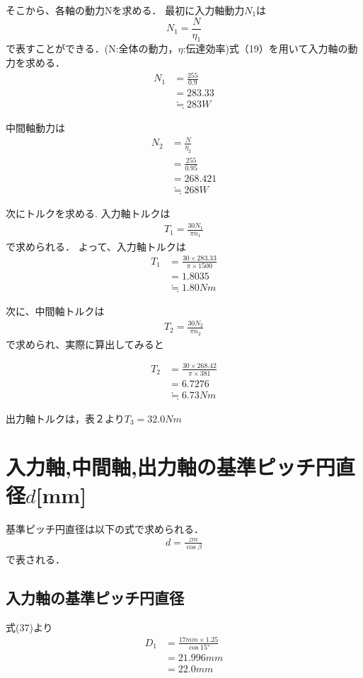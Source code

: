 \documentclass[a4paper,titlepage]{ltjsarticle}
\begin{document}
そこから、各軸の動力Nを求める．
最初に入力軸動力$N_1$は
\begin{equation}
	N_1=\frac{N}{\eta _1}
\end{equation}
で表すことができる．(N:全体の動力，$\eta $:伝達効率)式（19）を用いて入力軸の動力を求める．
\begin{align}
	N_1&=\frac{255}{0.9}\\
	&=283.33\\
	&\fallingdotseq 283 \si{W}
\end{align}

中間軸動力は
\begin{align}
\label{a}
N_2 &=\frac{N}{\eta _2}\\
&=\frac{255}{0.95}\\
&=268.421\\
&\fallingdotseq 268 {\si{W}}
\end{align}

次にトルクを求める.
入力軸トルクは
\begin{align}
\label{}
T_1=\frac{30N_1}{\pi n_1}
\end{align}
で求められる．
よって、入力軸トルクは
\begin{align}
\label{}
T_1&=\frac{30\times 283.33}{\pi \times 1500}\\
&=1.8035\\
&\fallingdotseq 1.80{ \si{Nm}}
\end{align}

次に、中間軸トルクは
\begin{align}
\label{}
T_2=\frac{30N_2}{\pi n_2}
\end{align}
で求められ、実際に算出してみると

\begin{align}
\label{}
T_2&=\frac{30 \times268.42}{\pi \times 381}\\
&=6.7276\\
&\fallingdotseq 6.73{\si{Nm}}
\end{align}

出力軸トルクは，表２より$T_3=32.0{ \si{Nm}}$

\section{入力軸,中間軸,出力軸の基準ピッチ円直径$d$[mm]}
基準ピッチ円直径は以下の式で求められる．
\begin{align}
\label{}
d=\frac{zm}{\cos\beta }
\end{align}
で表される．

\subsection{入力軸の基準ピッチ円直径}
式(37)より
\begin{align}
	D_1&=\frac{17{ \si{mm}}\times1.25}{\cos\ang{15}}\\
	   &=21.996 {\si{mm}}\\
		 &=22.0 {\si{mm}}
\end{align}
\end{document}

